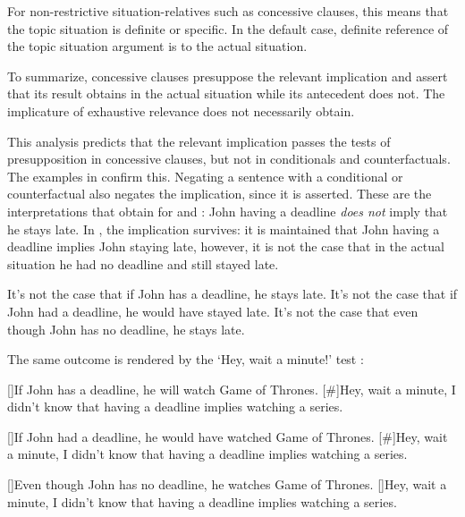\documentclass[output=paper]{langscibook}
\begin{document}
\noindent For non-restrictive situation-relatives such as concessive clauses, this means that the topic situation is definite or specific. In the default case, definite reference of the topic situation argument is to the actual situation.

To summarize, concessive clauses presuppose the relevant implication and assert that its result obtains in the actual situation while its antecedent does not. The implicature of exhaustive relevance does not necessarily obtain.

This analysis predicts that the relevant implication passes the tests of presupposition in concessive clauses, but not in conditionals and counterfactuals. The examples in  confirm this. Negating a sentence with a conditional or counterfactual also negates the implication, since it is asserted. These are the interpretations that obtain for  and : John having a deadline \emph{does not} imply that he stays late. In , the implication survives: it is maintained that John having a deadline implies John staying late, however, it is not the case that in the actual situation he had no deadline and still stayed late.

\ea\label{ex:PresupTest1}
\ea It's not the case that if John has a deadline, he stays late.\label{ex:PresupTest1-a}
\ex It's not the case that if John had a deadline, he would have stayed late.\label{ex:PresupTest1-b}
\ex It's not the case that even though John has no deadline, he stays late.\label{ex:PresupTest1-c}
\z\z

\noindent The same outcome is rendered by the `Hey, wait a minute!' test \citep[see][]{Fintel2004}:

\ea\label{ex:PresupTest2}
\ea\label{ex:PresupTest2-a}
\begin{xlist}
[]{If John has a deadline, he will watch Game of Thrones.}
[\#]{Hey, wait a minute, I didn't know that having a deadline implies watching a series.\smallskip}
\end{xlist}
\ex\label{ex:PresupTest2-b}
\begin{xlist}
[]{If John had a deadline, he would have watched Game of Thrones.}
[\#]{Hey, wait a minute, I didn't know that having a deadline implies watching a series.\smallskip}
\end{xlist}
\ex\label{ex:PresupTest2-c}
\begin{xlist}
[]{Even though John has no deadline, he watches Game of Thrones.}
[]{Hey, wait a minute, I didn't know that having a deadline implies watching a series.}
\end{xlist}
\z\z
\end{document}
